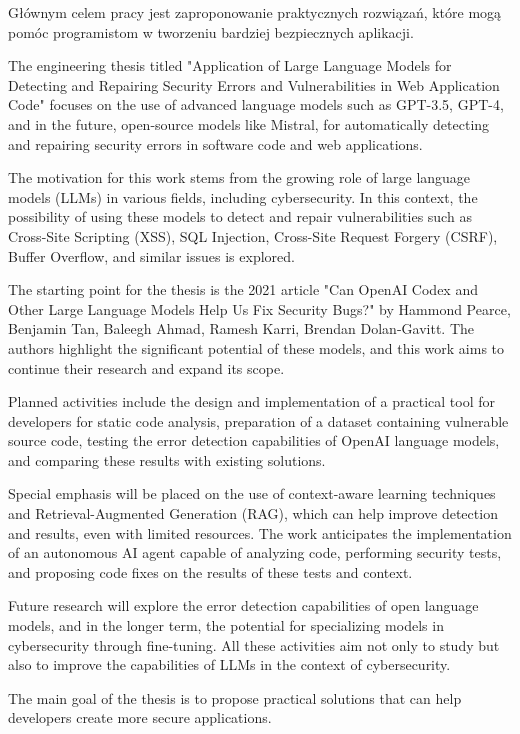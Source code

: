 {Głównym celem pracy jest zaproponowanie praktycznych rozwiązań, które mogą pomóc programistom w tworzeniu bardziej bezpiecznych aplikacji.

}{
The engineering thesis titled "Application of Large Language Models for Detecting and Repairing Security Errors and Vulnerabilities in Web Application Code" focuses on the use of advanced language models such as GPT-3.5, GPT-4, and in the future, open-source models like Mistral, for automatically detecting and repairing security errors in software code and web applications.

The motivation for this work stems from the growing role of large language models (LLMs) in various fields, including cybersecurity. In this context, the possibility of using these models to detect and repair vulnerabilities such as Cross-Site Scripting (XSS), SQL Injection, Cross-Site Request Forgery (CSRF), Buffer Overflow, and similar issues is explored.

The starting point for the thesis is the 2021 article "Can OpenAI Codex and Other Large Language Models Help Us Fix Security Bugs?" by Hammond Pearce, Benjamin Tan, Baleegh Ahmad, Ramesh Karri, Brendan Dolan-Gavitt. The authors highlight the significant potential of these models, and this work aims to continue their research and expand its scope.

Planned activities include the design and implementation of a practical tool for developers for static code analysis, preparation of a dataset containing vulnerable source code, testing the error detection capabilities of OpenAI language models, and comparing these results with existing solutions.

Special emphasis will be placed on the use of context-aware learning techniques and Retrieval-Augmented Generation (RAG), which can help improve detection and results, even with limited resources. The work anticipates the implementation of an autonomous AI agent capable of analyzing code, performing security tests, and proposing code fixes on the results of these tests and context.

Future research will explore the error detection capabilities of open language models, and in the longer term, the potential for specializing models in cybersecurity through fine-tuning. All these activities aim not only to study but also to improve the capabilities of LLMs in the context of cybersecurity.

The main goal of the thesis is to propose practical solutions that can help developers create more secure applications.


}